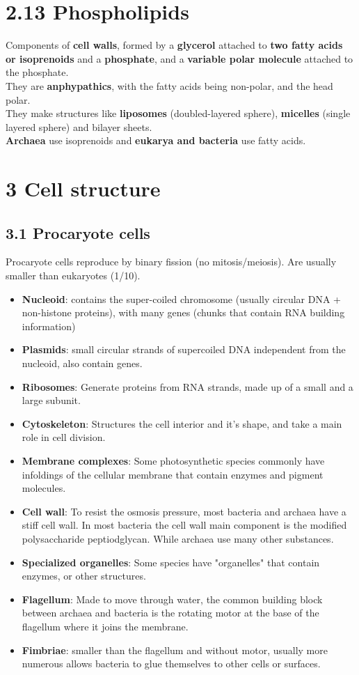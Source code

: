 \documentclass[a4paper,landscape,10pt]{cheatsheet}
\begin{document}
\section*{2.13 Phospholipids}
Components of \textbf{cell walls}, formed by a \textbf{glycerol} attached to \textbf{two fatty acids or isoprenoids} and
a \textbf{phosphate}, and a \textbf{variable polar molecule} attached to the phosphate.\\
\medskip
They are \textbf{anphypathics}, with the fatty acids being non-polar, and the head polar.\\
\medskip
They make structures like \textbf{liposomes} (doubled-layered sphere), \textbf{micelles} (single layered sphere) and
bilayer sheets.\\
\medskip
\textbf{Archaea} use isoprenoids and \textbf{eukarya and bacteria} use fatty acids.


\section*{3 Cell structure}
\subsection*{3.1 Procaryote cells}
Procaryote cells reproduce by binary fission (no mitosis/meiosis). Are usually smaller than eukaryotes (1/10).
\begin{itemize}
      \item \textbf{Nucleoid}: contains the super-coiled chromosome (usually circular DNA + non-histone proteins), with many
            genes (chunks that contain RNA building information)
      \item \textbf{Plasmids}: small circular strands of supercoiled DNA independent from the nucleoid, also contain genes.
      \item \textbf{Ribosomes}: Generate proteins from RNA strands, made up of a small and a large subunit.
      \item \textbf{Cytoskeleton}: Structures the cell interior and it's shape, and take a main role in cell division.
      \item \textbf{Membrane complexes}: Some photosynthetic species commonly have infoldings of the cellular membrane that
            contain enzymes and pigment molecules.
      \item \textbf{Cell wall}: To resist the osmosis pressure, most bacteria and archaea have a stiff cell wall. In most
            bacteria the cell wall main component is the modified polysaccharide peptiodglycan. While archaea use many other
            substances.
      \item \textbf{Specialized organelles}: Some species have "organelles" that contain enzymes, or other structures.
      \item \textbf{Flagellum}: Made to move through water, the common building block between archaea and bacteria is the
            rotating motor at the base of the flagellum where it joins the membrane.
      \item \textbf{Fimbriae}: smaller than the flagellum and without motor, usually more numerous allows bacteria to glue
            themselves to other cells or surfaces.
\end{itemize}
\end{document}
